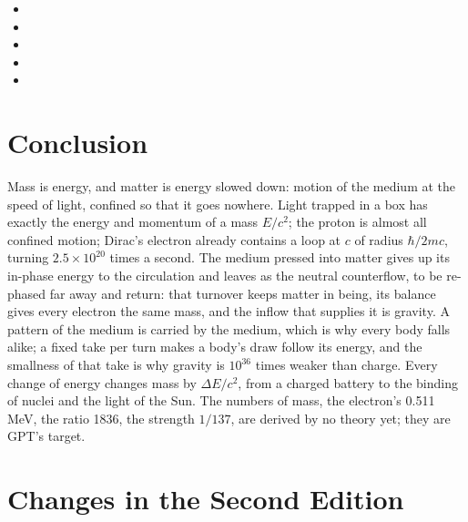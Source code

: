 \documentclass[11pt,a4paper]{article}
\begin{document}
\begin{itemize}
\item {}
\item {}
\item {}
\item {}
\item {}
\end{itemize}

\section*{Conclusion}

Mass is energy, and matter is energy slowed down: motion of the medium at the speed of light, confined so that it goes nowhere. Light trapped in a box has exactly the energy and momentum of a mass $E/c^2$; the proton is almost all confined motion; Dirac's electron already contains a loop at $c$ of radius $\hbar/2mc$, turning $2.5\times10^{20}$ times a second. The medium pressed into matter gives up its in-phase energy to the circulation and leaves as the neutral counterflow, to be re-phased far away and return: that turnover keeps matter in being, its balance gives every electron the same mass, and the inflow that supplies it is gravity. A pattern of the medium is carried by the medium, which is why every body falls alike; a fixed take per turn makes a body's draw follow its energy, and the smallness of that take is why gravity is $10^{36}$ times weaker than charge. Every change of energy changes mass by $\Delta E/c^2$, from a charged battery to the binding of nuclei and the light of the Sun. The numbers of mass, the electron's 0.511 MeV, the ratio 1836, the strength $1/137$, are derived by no theory yet; they are GPT's target.

\section*{Changes in the Second Edition}
\end{document}
